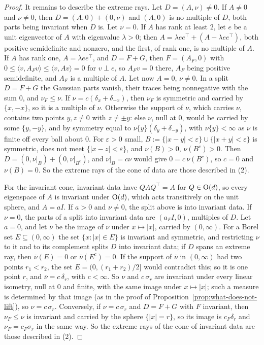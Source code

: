 \begin{proof}
It remains to describe the extreme rays. Let $D = (A, \nu) \ne 0$. If $A \ne 0$ and $\nu \ne 0$,
then $D = (A, 0) + (0, \nu)$ and $(A, 0)$ is no multiple of $D$, both parts being invariant when $D$
is. Let $\nu = 0$. If $A$ has rank at least $2$, let $e$ be a unit eigenvector of $A$ with
eigenvalue $\lambda > 0$; then $A = \lambda ee^\top + (A - \lambda ee^\top)$, both positive
semidefinite and nonzero, and the first, of rank one, is no multiple of $A$. If $A$ has rank one,
$A = \lambda ee^\top$, and $D = F + G$, then $F = (A_F, 0)$ with
$0 \le \langle v, A_Fv\rangle \le \langle v, Av\rangle = 0$ for $v \perp e$, so $A_Fv = 0$ there, $A_F$
being positive semidefinite, and $A_F$ is a multiple of $A$. Let now $A = 0$, $\nu \ne 0$. In a split
$D = F + G$ the Gaussian parts vanish, their traces being nonnegative with the sum $0$, and
$\nu_F \le \nu$. If $\nu = c(\delta_x + \delta_{-x})$, then $\nu_F$ is symmetric and carried by
$\{x, -x\}$, so it is a multiple of $\nu$. Otherwise the support of $\nu$, which carries $\nu$,
contains two points $y, z \ne 0$ with $z \ne \pm y$: else $\nu$, null at $0$, would be carried by
some $\{y, -y\}$, and by symmetry equal to $\nu\{y\}(\delta_y + \delta_{-y})$, with
$\nu\{y\} < \infty$ as $\nu$ is finite off every ball about $0$. For $\varepsilon > 0$ small, $B := \{|x - y| < \varepsilon\} \cup
\{|x + y| < \varepsilon\}$ is symmetric, does not meet $\{|x - z| < \varepsilon\}$, and
$\nu(B) > 0$, $\nu(B^c) > 0$. Then $D = (0, \nu|_B) + (0, \nu|_{B^c})$, and $\nu|_B = c\nu$ would
give $0 = c\,\nu(B^c)$, so $c = 0$ and $\nu(B) = 0$. So the extreme rays of the cone of data are
those described in (2).

For the invariant cone, invariant data have $QAQ^\top = A$ for $Q \in \mathrm{O}(d)$, so every eigenspace
of $A$ is invariant under $\mathrm{O}(d)$, which acts transitively on the unit sphere, and $A = aI$. If
$a > 0$ and $\nu \ne 0$, the split above is into invariant data. If $\nu = 0$, the parts of a split
into invariant data are $(a_FI, 0)$, multiples of $D$. Let $a = 0$, and let $\overline\nu$ be the
image of $\nu$ under $x \mapsto |x|$, carried by $(0, \infty)$. For a Borel set $E \subseteq (0,
\infty)$ the set $\{x : |x| \in E\}$ is invariant and symmetric, and restricting $\nu$ to it and to
its complement splits $D$ into invariant data; if $D$ spans an extreme ray, then
$\overline\nu(E) = 0$ or $\overline\nu(E^c) = 0$. If the support of $\overline\nu$ in $(0,\infty)$ had
two points $r_1 < r_2$, the set $E = (0, (r_1 + r_2)/2]$ would contradict this; so it is one point
$r$, and $\overline\nu = c\,\delta_r$, with $c < \infty$. So $\nu$ and $c\,\sigma_r$ are invariant
under every linear isometry, null at $0$ and finite, with the same image under $x \mapsto |x|$; such
a measure is determined by that image (as in the proof of
Proposition~\ref{prop:what-does-not-lift}), so $\nu = c\,\sigma_r$. Conversely, if
$\nu = c\,\sigma_r$ and $D = F + G$ with $F$ invariant, then $\nu_F \le \nu$ is invariant and carried
by the sphere $\{|x| = r\}$, so its image is $c_F\delta_r$ and $\nu_F = c_F\sigma_r$ in the same way.
So the extreme rays of the cone of invariant data are those described in (2).


\end{proof}

